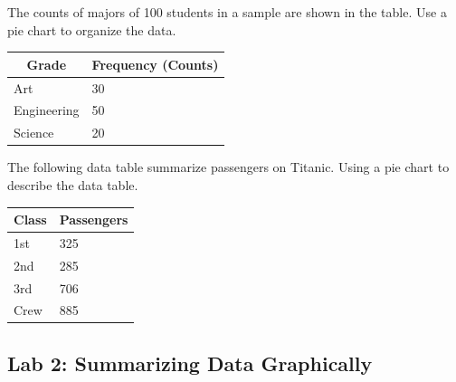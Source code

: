 \begin{example}
The counts of majors of 100 students in a sample are shown in the table.
Use a pie chart to organize the data.

\begin{table}[h!]
  \begin{small}
      \begin{tabular}[c]{l|l}
        \hline
        \multicolumn{1}{c}{\textbf{Grade}} & 
        \multicolumn{1}{c}{\textbf{Frequency (Counts)}} \\
        \hline
        Art & 30 \\
        Engineering & 50 \\
        Science & 20 \\
        \hline
      \end{tabular}
  \end{small}
\end{table}
\end{example}
\vspace*{5\baselineskip}

\begin{exercise}
The following data table summarize passengers on Titanic. Using a pie
chart to describe the data table.

\begin{table}[h!]
  \begin{small}
      \begin{tabular}[c]{l|l}
        \hline
        \multicolumn{1}{c}{\textbf{Class}} & 
        \multicolumn{1}{c}{\textbf{Passengers}} \\
        \hline
        1st & 325 \\
        2nd & 285 \\
        3rd & 706 \\
        Crew & 885 \\
        \hline
      \end{tabular}
  \end{small}
\end{table}

\end{exercise}
\vspace*{5\baselineskip}


\hypertarget{lab-2-summarizing-data-graphically}{%
\subsection{Lab 2: Summarizing Data
Graphically}\label{lab-2-summarizing-data-graphically}}

